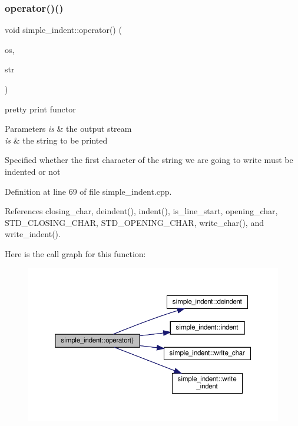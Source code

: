 \subsubsection{\texorpdfstring{operator()()}{operator()()}}
{\footnotesize\ttfamily void simple\+\_\+indent\+::operator() (\begin{DoxyParamCaption}\item[{std\+::ostream \&}]{os,  }\item[{const std\+::string \&}]{str }\end{DoxyParamCaption})}



pretty print functor 


\begin{DoxyParams}{Parameters}
{\em is} & the output stream \\
\hline
{\em is} & the string to be printed \\
\hline
\end{DoxyParams}
Specified whether the first character of the string we are going to write must be indented or not 

Definition at line 69 of file simple\+\_\+indent.\+cpp.



References closing\+\_\+char, deindent(), indent(), is\+\_\+line\+\_\+start, opening\+\_\+char, S\+T\+D\+\_\+\+C\+L\+O\+S\+I\+N\+G\+\_\+\+C\+H\+AR, S\+T\+D\+\_\+\+O\+P\+E\+N\+I\+N\+G\+\_\+\+C\+H\+AR, write\+\_\+char(), and write\+\_\+indent().

Here is the call graph for this function\+:
\nopagebreak
\begin{figure}[H]
\begin{center}
\leavevmode
\includegraphics[width=350pt]{db/d73/classsimple__indent_a3199d4f7593b10ca63ab8955e43f3985_cgraph}
\end{center}
\end{figure}
\mbox{\label{classsimple__indent_a945ebea4ab143178d2664fa746cb0228}} 
